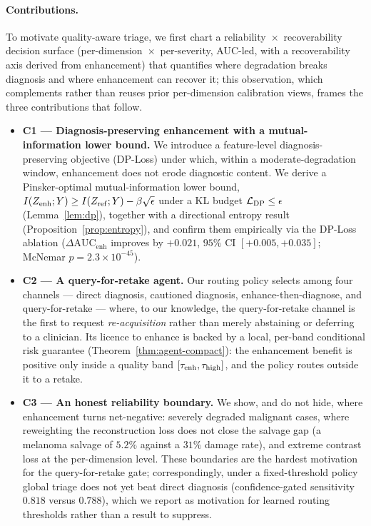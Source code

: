 \documentclass{article}
\begin{document}
\paragraph{Contributions.}
To motivate quality-aware triage, we first chart a reliability~$\times$~recoverability decision
surface (per-dimension~$\times$~per-severity, AUC-led, with a recoverability axis derived from
enhancement) that quantifies where degradation breaks diagnosis and where enhancement can recover it;
this observation, which complements rather than reuses prior per-dimension calibration views, frames
the three contributions that follow.
\begin{itemize}
\item \textbf{C1 --- Diagnosis-preserving enhancement with a mutual-information lower bound.} We
introduce a feature-level diagnosis-preserving objective (DP-Loss) under which, within a
moderate-degradation window, enhancement does not erode diagnostic content. We derive a
Pinsker-optimal mutual-information lower bound, $I(Z_{\mathrm{enh}};Y)\geq I(Z_{\mathrm{ref}};Y)-\beta\sqrt{\epsilon}$ under
a KL budget $\mathcal{L}_{\mathrm{DP}}\leq\epsilon$ (Lemma~\ref{lem:dp}), together with a directional entropy result
(Proposition~\ref{prop:entropy}), and confirm them empirically via the DP-Loss ablation
($\Delta\mathrm{AUC}_{\text{enh}}$ improves by $+0.021$, $95\%$ CI $[+0.005,+0.035]$; McNemar
$p=2.3\times10^{-45}$).
\item \textbf{C2 --- A query-for-retake agent.} Our routing policy selects among four channels ---
direct diagnosis, cautioned diagnosis, enhance-then-diagnose, and query-for-retake --- where, to our
knowledge, the query-for-retake channel is the first to request \emph{re-acquisition} rather than
merely abstaining or deferring to a clinician. Its licence to enhance is backed by a local, per-band
conditional risk guarantee (Theorem~\ref{thm:agent-compact}): the enhancement benefit is positive only
inside a quality band $[\tau_{\mathrm{enh}},\tau_{\mathrm{high}}]$, and the policy routes outside it to a retake.
\item \textbf{C3 --- An honest reliability boundary.} We show, and do not hide, where enhancement turns
net-negative: severely degraded malignant cases, where reweighting the reconstruction loss does not
close the salvage gap (a melanoma salvage of $5.2\%$ against a $31\%$ damage rate), and extreme
contrast loss at the per-dimension level. These boundaries are the hardest motivation for the
query-for-retake gate; correspondingly, under a fixed-threshold policy global triage does not yet beat
direct diagnosis (confidence-gated sensitivity $0.818$ versus $0.788$), which we report as motivation
for learned routing thresholds rather than a result to suppress.
\end{itemize}
\end{document}
